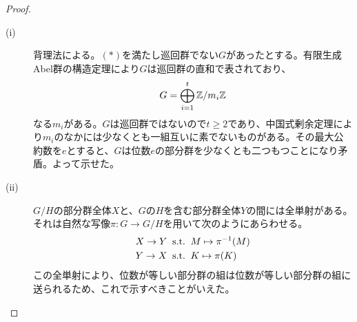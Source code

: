 \begin{proof} ${}$
  \begin{description}
    \item[(i)] 背理法による。$(*)$を満たし巡回群でない$G$があったとする。有限生成Abel群の構造定理により$G$は巡回群の直和で表されており、
    \[
    G = \bigoplus_{i=1}^t {\mathbb Z} / m_i {\mathbb Z}
    \]
    なる$m_i$がある。$G$は巡回群ではないので$t \geq 2$であり、中国式剰余定理により$m_i$のなかには少なくとも一組互いに素でないものがある。その最大公約数を$e$とすると、$G$は位数$e$の部分群を少なくとも二つもつことになり矛盾。よって示せた。
    \item[(ii)] $G/H$の部分群全体$X$と、$G$の$H$を含む部分群全体$Y$の間には全単射がある。それは自然な写像$\pi \colon G \to G/H$を用いて次のようにあらわせる。
    \begin{align*}
      &X \to Y \; \; \text{s.t.} \; \; M \mapsto \pi^{-1}(M) \\
      &Y \to X \; \; \text{s.t.} \; \; K \mapsto \pi(K)
    \end{align*}
    この全単射により、位数が等しい部分群の組は位数が等しい部分群の組に送られるため、これで示すべきことがいえた。
    \end{description}
\end{proof}

\newpage


